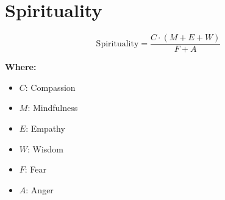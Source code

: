 \chapter{Spirituality}

\begin{equation}
\text{Spirituality} = \frac{C \cdot (M + E + W)}{F + A}
\end{equation}

\textbf{Where:}

\begin{itemize}
    \item $C$: Compassion
    \item $M$: Mindfulness
    \item $E$: Empathy
    \item $W$: Wisdom
    \item $F$: Fear
    \item $A$: Anger
\end{itemize}